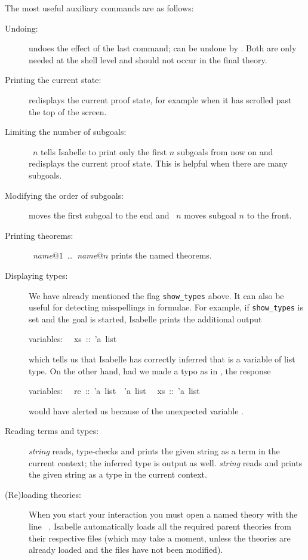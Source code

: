 The most useful auxiliary commands are as follows:
\begin{description}
\item[Undoing:]  undoes the effect of
the
  last command;  can be undone by
  .  Both are only needed at the shell
  level and should not occur in the final theory.
\item[Printing the current state:] 
redisplays
  the current proof state, for example when it has scrolled past the top of
  the screen.
\item[Limiting the number of subgoals:] ~$n$ tells Isabelle to
  print only the first $n$ subgoals from now on and redisplays the current
  proof state. This is helpful when there are many subgoals.
\item[Modifying the order of subgoals:]
 moves the first subgoal to the end and
~$n$ moves subgoal $n$ to the front.
\item[Printing theorems:]
  ~\textit{name}$@1$~\dots~\textit{name}$@n$
  prints the named theorems.
\item[Displaying types:] We have already mentioned the flag
  \texttt{show_types} above.
  It can also be useful for detecting misspellings in
  formulae. For example, if \texttt{show_types} is set and the goal
   is started, Isabelle prints the additional output
\par\noindent
\begin{isabelle}%
variables:\isanewline
~~xs~::~'a~list
\end{isabelle}%
\par\noindent
which tells us that Isabelle has correctly inferred that
 is a variable of list type. On the other hand, had we
made a typo as in , the response
\par\noindent
\begin{isabelle}%
variables:\isanewline
~~re~::~'a~list~{\isasymRightarrow}~'a~list\isanewline
~~xs~::~'a~list%
\end{isabelle}%
\par\noindent
would have alerted us because of the unexpected variable .
\item[Reading terms and types:] 
  \textit{string} reads, type-checks and prints the given string as a term in
  the current context; the inferred type is output as well.
   \textit{string} reads and prints the given
  string as a type in the current context.
\item[(Re)loading theories:] When you start your interaction you must open a
  named theory with the line ~. Isabelle
  automatically loads all the required parent theories from their respective
  files (which may take a moment, unless the theories are already loaded and
  the files have not been modified).
  

\end{description}
